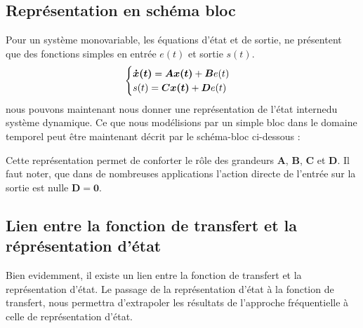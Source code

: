 \subsection{Représentation en schéma bloc}
Pour un système monovariable, les équations d'état et de sortie, ne présentent
que des fonctions simples en entrée $e(t)$ et sortie $s(t)$.
\[
\begin{cases}
    \boldsymbol{\dot{x}}\boldsymbol{(t)}= \boldsymbol{A}\boldsymbol{x}\boldsymbol{(t)} + \boldsymbol{B} e(t)\\
    s(t)=\boldsymbol{C} \boldsymbol{x}\boldsymbol{(t)} + \boldsymbol{D} e(t)
\end{cases}
\]
nous pouvons maintenant nous donner une représentation de 
\og l'état interne\fg du système dynamique. Ce que nous 
modélisions par un simple bloc dans le domaine temporel peut être maintenant 
décrit par le schéma-bloc ci-dessous :
\begin{center}
    
\end{center}
Cette représentation permet de conforter le rôle des grandeurs $\boldsymbol{A}$,
$\boldsymbol{B}$, $\boldsymbol{C}$ et
$\boldsymbol{D}$. Il faut noter, que dans de nombreuses applications 
l'action directe de l'entrée sur la sortie est nulle $\boldsymbol{D=0}$.
\subsection{Lien entre la fonction de transfert et la réprésentation d'état}
Bien evidemment, il existe un lien entre la fonction de transfert et la 
représentation d'état. Le passage de la représentation d'état à la fonction
de transfert, nous permettra d'extrapoler les résultats de l'approche 
fréquentielle à celle de représentation d'état.

